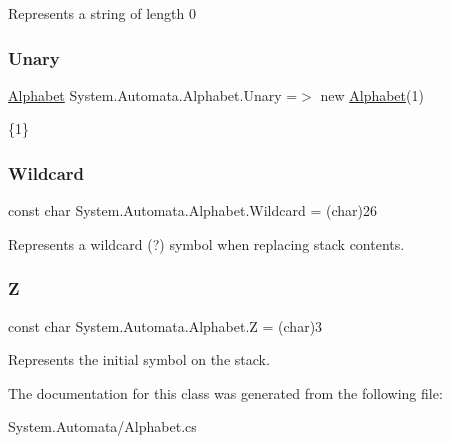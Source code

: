 Represents a string of length 0 

\mbox{\label{class_system_1_1_automata_1_1_alphabet_afa68a933ddc9aaa35cbeb8aa42ece58c}} 
\subsubsection{\texorpdfstring{Unary}{Unary}}
{\footnotesize\ttfamily \mbox{\hyperlink{class_system_1_1_automata_1_1_alphabet}{Alphabet}} System.\+Automata.\+Alphabet.\+Unary =$>$ new \mbox{\hyperlink{class_system_1_1_automata_1_1_alphabet}{Alphabet}}(\textquotesingle{}1\textquotesingle{})\hspace{0.3cm}{\ttfamily [static]}}



\{1\} 

\mbox{\label{class_system_1_1_automata_1_1_alphabet_a8aa33ab3472191b4ff0234791718af25}} 
\subsubsection{\texorpdfstring{Wildcard}{Wildcard}}
{\footnotesize\ttfamily const char System.\+Automata.\+Alphabet.\+Wildcard = (char)26}



Represents a wildcard (?) symbol when replacing stack contents. 

\mbox{\label{class_system_1_1_automata_1_1_alphabet_a1c103a38506cc7b398a6974baa5ead67}} 
\subsubsection{\texorpdfstring{Z}{Z}}
{\footnotesize\ttfamily const char System.\+Automata.\+Alphabet.\+Z = (char)3}



Represents the initial symbol on the stack. 



The documentation for this class was generated from the following file\+:\begin{DoxyCompactItemize}
\item 
System.\+Automata/Alphabet.\+cs\end{DoxyCompactItemize}
